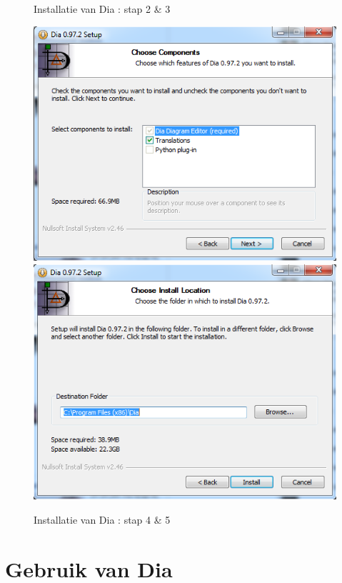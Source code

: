 \documentclass[12pt,a4paper]{report}
\begin{document}
\begin{flushleft}
\begin{figure}[H]
\label{install_04}
\vspace{-25pt}
\caption{Installatie van Dia : stap 2 \& 3} 
\end{figure}
\begin{figure}[H]
\includegraphics[scale=0.5]{images/install_05.png}
\label{install_05}
\includegraphics[scale=0.5]{images/install_06.png}
\label{install_06}
\centering 
\vspace{-25pt}
\caption{Installatie van Dia : stap 4 \& 5}  
\end{figure}
\pagebreak
\section{Gebruik van Dia}

\end{flushleft}
\end{document}
